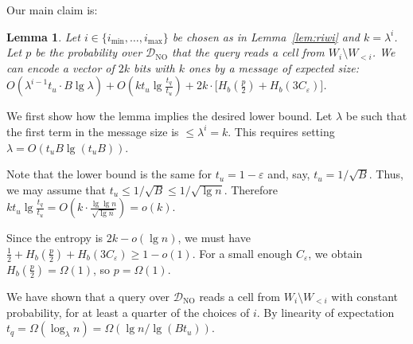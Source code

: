 \documentclass[letterpaper,11pt]{article}
\newtheorem{lemma}[theorem]{Lemma}
\newcommand{\eps}{\varepsilon}
\newcommand{\calD}{\mathcal{D}}
\newcommand{\Dno}{\calD_{\mathrm{NO}}}
\newcommand{\imax}{{i_{\max}}}
\newcommand{\imin}{{i_{\min}}}
\begin{document}
Our main claim is:

\begin{lemma}   \label{lem:subconst-tu}
Let $i \in \{ \imin, \dots, \imax \}$ be chosen as in
Lemma~\ref{lem:riwi} and $k = \lambda^i$. Let $p$ be the probability
over $\Dno$ that the query reads a cell from $W_i \setminus
W_{<i}$. We can encode a vector of $2k$ bits with $k$ ones by a
message of expected size: $O(\lambda^{i-1} t_u \cdot B \lg \lambda) +
O(k t_u \lg \frac{t_q}{t_u}) + 2k \cdot \big[ H_b(\frac{p}{2}) +
  H_b(3C_\eps) \big]$.
\end{lemma}

We first show how the lemma implies the desired lower bound. Let
$\lambda$ be such that the first term in the message size is $\le
\lambda^i = k$. This requires setting $\lambda = O(t_u B \lg (t_u B))$.

Note that the lower bound is the same for $t_u=1-\eps$ and, say, $t_u
= 1/\sqrt{B}$. Thus, we may assume that $t_u\le 1/\sqrt{B} \le
1/\sqrt{\lg n}$. Therefore $k t_u \lg \frac{t_q}{t_u} = O(k \cdot
\frac{\lg\lg n}{\sqrt{\lg n}}) = o(k)$.

Since the entropy is $2k-o(\lg n)$, we must have $\frac{1}{2} +
H_b(\frac{p}{2}) + H_b(3C_\eps) \ge 1-o(1)$. For a small enough
$C_\eps$, we obtain $H_b(\frac{p}{2}) = \Omega(1)$, so $p= \Omega(1)$.

We have shown that a query over $\Dno$ reads a cell from $W_i
\setminus W_{<i}$ with constant probability, for at least a quarter of
the choices of $i$. By linearity of expectation $t_q =
\Omega(\log_\lambda n) = \Omega(\lg n / \lg (Bt_u))$.
\end{document}
